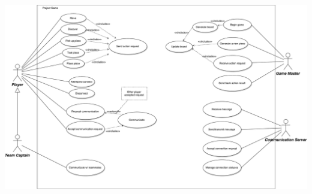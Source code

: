 \documentclass[11pt]{article}
\begin{document}
\hspace*{-4cm}
\resizebox{1.5\textwidth}{!}
{
\includegraphics{usecase}
}
\FloatBarrier
\end{document}
